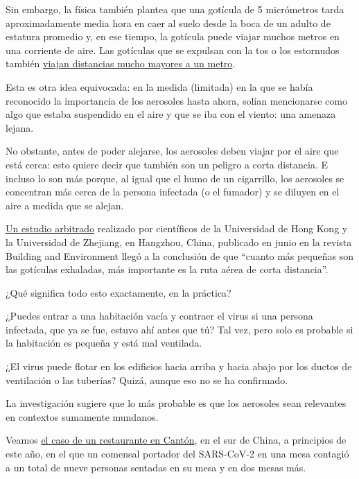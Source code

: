 Sin embargo, la física también plantea que una gotícula de 5 micrómetros
tarda aproximadamente media hora en caer al suelo desde la boca de un
adulto de estatura promedio y, en ese tiempo, la gotícula puede viajar
muchos metros en una corriente de aire. Las gotículas que se expulsan
con la tos o los estornudos también
\href{https://academic.oup.com/jid/advance-article/doi/10.1093/infdis/jiaa189/5820886}{viajan
distancias mucho mayores a un metro}.

Esta es otra idea equivocada: en la medida (limitada) en la que se había
reconocido la importancia de los aerosoles hasta ahora, solían
mencionarse como algo que estaba suspendido en el aire y que se iba con
el viento: una amenaza lejana.

No obstante, antes de poder alejarse, los aerosoles deben viajar por el
aire que está cerca: esto quiere decir que también son un peligro a
corta distancia. E incluso lo son más porque, al igual que el humo de un
cigarrillo, los aerosoles se concentran más cerca de la persona
infectada (o el fumador) y se diluyen en el aire a medida que se alejan.

\href{https://www.sciencedirect.com/science/article/abs/pii/S0360132320302183?via\%3Dihub}{Un
estudio arbitrado} realizado por científicos de la Universidad de Hong
Kong y la Universidad de Zhejiang, en Hangzhou, China, publicado en
junio en la revista Building and Environment llegó a la conclusión de
que ``cuanto más pequeñas son las gotículas exhaladas, más importante es
la ruta aérea de corta distancia''.

¿Qué significa todo esto exactamente, en la práctica?

¿Puedes entrar a una habitación vacía y contraer el virus si una persona
infectada, que ya se fue, estuvo ahí antes que tú? Tal vez, pero solo es
probable si la habitación es pequeña y está mal ventilada.

¿El virus puede flotar en los edificios hacia arriba y hacia abajo por
los ductos de ventilación o las tuberías? Quizá, aunque eso no se ha
confirmado.

La investigación sugiere que lo más probable es que los aerosoles sean
relevantes en contextos sumamente mundanos.

Veamos
\href{https://www.nytimes3xbfgragh.onion/2020/04/20/health/airflow-coronavirus-restaurants.html}{el
caso de un restaurante en Cantón}, en el sur de China, a principios de
este año, en el que un comensal portador del SARS-CoV-2 en una mesa
contagió a un total de nueve personas sentadas en su mesa y en dos mesas
más.

